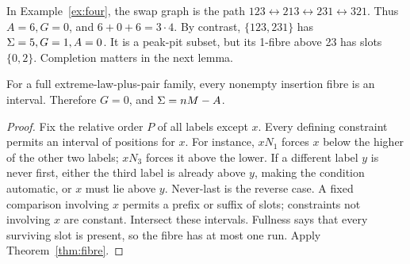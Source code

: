 In Example~\ref{ex:four}, the swap graph is the path
\(123\leftrightarrow213\leftrightarrow231\leftrightarrow321\).
Thus \(A=6,G=0\), and \(6+0+6=3\cdot4\).
By contrast, \(\{123,231\}\) has \(\Sigma=5,G=1,A=0\).
It is a peak-pit subset, but its 1-fibre above 23 has slots \(\{0,2\}\).
Completion matters in the next lemma.

\begin{lemma}\label{lem:interval}
For a full extreme-law-plus-pair family, every nonempty insertion fibre
is an interval. Therefore \(G=0\), and \(\Sigma=nM-A\).
\end{lemma}
\begin{proof}
Fix the relative order \(P\) of all labels except \(x\). Every defining
constraint permits an interval of positions for \(x\). For instance,
\(xN_1\) forces \(x\) below the higher of the other two labels;
\(xN_3\) forces it above the lower. If a different label \(y\) is
never first, either the third label is already above \(y\), making
the condition automatic, or \(x\) must lie above \(y\). Never-last
is the reverse case. A fixed comparison involving \(x\) permits a
prefix or suffix of slots; constraints not involving \(x\) are constant.
Intersect these intervals. Fullness says that every surviving slot is
present, so the fibre has at most one run. Apply Theorem~\ref{thm:fibre}.
\end{proof}
